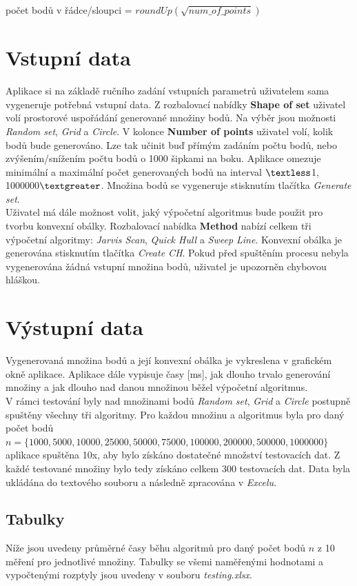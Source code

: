 \documentclass[a4paper, 12pt]{article}
\begin{document}
počet bodů v řádce/sloupci = $roundUp(\sqrt{num\_of\_points})$

\section{Vstupní data}
Aplikace si na základě ručního zadání vstupních parametrů uživatelem sama vygeneruje potřebná vstupní data. Z rozbalovací nabídky \textbf{Shape of set} uživatel volí prostorové uspořádání generované množiny bodů. Na výběr jsou možnosti \textit{Random set}, \textit{Grid} a \textit{Circle}. V kolonce \textbf{Number of points} uživatel volí, kolik bodů bude generováno. Lze tak učinit buď přímým zadáním počtu bodů, nebo zvýšením/snížením počtu bodů o 1000 šipkami na boku. Aplikace omezuje minimální a maximální počet generovaných bodů na interval $\textless$1, 1000000$\textgreater$. Množina bodů se vygeneruje stisknutím tlačítka \textsl{Generate set}.\\

Uživatel má dále možnost volit, jaký výpočetní algoritmus bude použit pro tvorbu konvexní obálky. Rozbalovací nabídka \textbf{Method} nabízí celkem tři výpočetní algoritmy: \textit{Jarvis Scan}, \textit{Quick Hull} a \textit{Sweep Line}. Konvexní obálka je generována stisknutím tlačítka \textsl{Create CH}. Pokud před spuštěním procesu nebyla vygenerována žádná vstupní množina bodů, uživatel je upozorněn chybovou hláškou. 

\section{Výstupní data}
Vygenerovaná množina bodů a její konvexní obálka je vykreslena v grafickém okně aplikace. Aplikace dále vypisuje časy [ms], jak dlouho trvalo generování množiny a jak dlouho nad danou množinou běžel výpočetní algoritmus.\\

V rámci testování byly nad množinami bodů \textit{Random set}, \textit{Grid} a \textit{Circle} postupně spuštěny všechny tři algoritmy. Pro každou množinu a algoritmus byla pro daný počet bodů $n = \{1000, 5000, 10000, 25000, 50000, 75000, 100000, 200000, 500000, 1000000\}$ aplikace spuš\-tě\-na 10x, aby bylo získáno dostatečné množství testovacích dat. Z každé testované množiny bylo tedy získáno celkem 300 testovacích dat. Data byla ukládána do textového souboru a následně zpracována v \textit{Excelu}.

\subsection{Tabulky}
Níže jsou uvedeny průměrné časy běhu algoritmů pro daný počet bodů $n$ z 10 měření pro jednotlivé množiny. Tabulky se všemi naměřenými hodnotami a vypočtenými rozptyly jsou uvedeny v souboru \textit{testing.xlsx}. 
\end{document}
